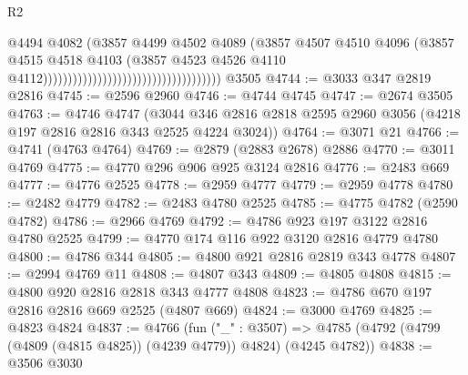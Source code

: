 \begin{lexlean}{R2}
\begin{coremodule}
                                                                    @4494
                                                                    @4082
                                                                    (@3857
                                                                      @4499
                                                                      @4502
                                                                      @4089
                                                                      (@3857
                                                                        @4507
                                                                        @4510
                                                                        @4096
                                                                        (@3857
                                                                          @4515
                                                                          @4518
                                                                          @4103
                                                                          (@3857
                                                                            @4523
                                                                            @4526
                                                                            @4110
                                                                            @4112))))))))))))))))))))))))))))))))))))
    @3505
@4744 := @3033 @347 @2819 @2816
@4745 := @2596 @2960
@4746 := @4744 @4745
@4747 := @2674 @3505
@4763 := @4746
    @4747
    (@3044 @346 @2816 @2818 @2595 @2960 @3056 (@4218 @197 @2816 @2816 @343 @2525 @4224 @3024))
@4764 := @3071 @21
@4766 := @4741 (@4763 @4764)
@4769 := @2879 (@2883 @2678) @2886
@4770 := @3011 @4769
@4775 := @4770 @296 @906 @925 @3124 @2816
@4776 := @2483 @669
@4777 := @4776 @2525
@4778 := @2959 @4777
@4779 := @2959 @4778
@4780 := @2482 @4779
@4782 := @2483 @4780 @2525
@4785 := @4775 @4782 (@2590 @4782)
@4786 := @2966 @4769
@4792 := @4786 @923 @197 @3122 @2816 @4780 @2525
@4799 := @4770 @174 @116 @922 @3120 @2816 @4779 @4780
@4800 := @4786 @344
@4805 := @4800 @921 @2816 @2819 @343 @4778
@4807 := @2994 @4769 @11
@4808 := @4807 @343
@4809 := @4805 @4808
@4815 := @4800 @920 @2816 @2818 @343 @4777 @4808
@4823 := @4786 @670 @197 @2816 @2816 @669 @2525 (@4807 @669)
@4824 := @3000 @4769
@4825 := @4823 @4824
@4837 := @4766
    (fun ("_" : @3507) =>
    @4785 (@4792 (@4799 (@4809 (@4815 @4825)) (@4239 @4779)) @4824) (@4245 @4782))
@4838 := @3506 @3030

\end{coremodule}
\end{lexlean}
